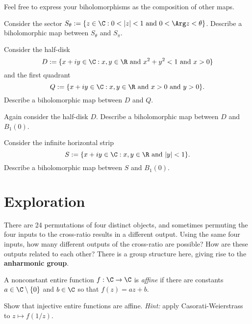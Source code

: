 \documentclass{homework}
\begin{document}
Feel free to express your
biholomorphisms as the composition of other maps.

\begin{problem}
  Consider the sector \(S_\theta := \{ z \in \C : 0 < |z| < 1 \mbox{ and } 0 < \Arg z < \theta \}\). Describe a biholomorphic map between $S_\theta$ and $S_\pi$.
\end{problem}

\begin{problem}
  Consider the half-disk
  \[
    D := \{ x + iy \in \C : x, y \in \R \mbox{ and } x^2+y^2 < 1 \mbox{ and } x > 0 \}
  \]
  and the first quadrant
  \[
    Q := \{ x + iy \in \C : x, y \in \R \mbox{ and } x > 0 \mbox{ and } y > 0 \}.
  \]
  Describe a biholomorphic map between $D$ and $Q$.
\end{problem}

\begin{problem}
  Again consider the half-disk $D$. Describe a biholomorphic map between $D$ and $B_1(0)$.
\end{problem}

\begin{problem}
  Consider the infinite horizontal strip
  \[
    S := \{ x + iy \in \C : x, y \in \R \mbox{ and } |y| < 1 \}.
  \]
  Describe a biholomorphic map between $S$ and $B_1(0)$.  
\end{problem}

\section{Exploration}

\begin{problem}
  There are 24 permutations of four distinct objects, and sometimes
  permuting the four inputs to the cross-ratio results in a different
  output.  Using the same four inputs, how many different outputs of
  the cross-ratio are possible?  How are these outputs related to each
  other?  There is a group structure here, giving rise to the
  \textbf{anharmonic group}.
\end{problem}

\begin{problem}\label{entire-injective-is-affine}A nonconstant entire function
  $f : \C \to \C$ is \textit{affine} if there are constants
  $a \in \C \setminus \{0\}$ and $b \in \C$ so that $f(z) = az + b$.
  
  Show that injective entire functions are affine.  \textit{Hint:}
  apply Casorati-Weierstrass to $z \mapsto f(1/z)$.
\end{problem}
\end{document}
